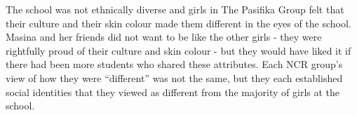 \label{ex:different}

\vspace{5 mm}

\noindent The school was not ethnically diverse and girls in The Pasifika Group felt that their culture and their skin colour made them different in the eyes of the school. Masina and her friends did not want to be like the other girls - they were rightfully proud of their culture and skin colour - but they would have liked it if there had been more students who shared these attributes. Each NCR group's view of how they were ``different'' was not the same, but they each established social identities that they viewed as different from the majority of girls at the school.



